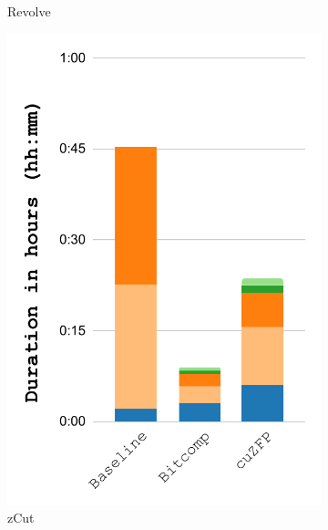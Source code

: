 \documentclass[Ingles,Final]{ic-tese-v3}
\begin{document}
\begin{figure}[h!]
\begin{subfigure}{0.3\textwidth}
        \caption{Revolve}
        \label{fig:compress_breakdown_revolve}
    \end{subfigure}%
    \begin{subfigure}{0.3\textwidth}
        \includegraphics[width=\textwidth,trim={0 0 0 0},clip]{figures/compress_breakdown/breakdown_compress_salt_zcut.pdf}
        \caption{zCut}
        \label{fig:compress_breakdown_zcut}
    \end{subfigure}%
    \begin{subfigure}{0.3\textwidth}

\end{subfigure}
\end{figure}
\end{document}
